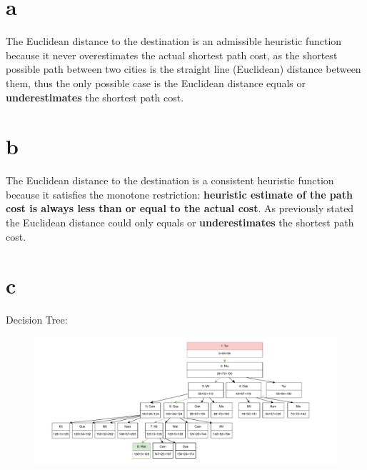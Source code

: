 \documentclass[12pt]{article}
\begin{document}
\subsection{} 
\begin{enumerate}
\part{a} 
	The Euclidean distance to the destination is an admissible heuristic function because it never overestimates the actual shortest path cost, as the shortest possible path between two cities is the straight line (Euclidean) distance between them, thus the only possible case is the Euclidean distance equals or \textbf{underestimates} the shortest path cost.

\part{b} 
	The Euclidean distance to the destination is a consistent heuristic function because it satisfies the monotone restriction: \textbf{heuristic estimate of the path cost is always less than or equal to the actual cost}. As previously stated the Euclidean distance could only equals or \textbf{underestimates} the shortest path cost.

\part{c} Decision Tree:
	\begin{figure}[H]
	\center
	\includegraphics[width=18cm]{486A1Q1.pdf}
	\end{figure}

\end{enumerate}


\newpage
\end{document}
